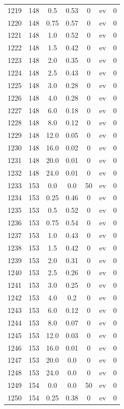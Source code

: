 \documentclass[12pt,a4paper]{article}
\begin{document}
\begin{tabular}{r|cccccc}
	1219 & 148 & 0.5 & 0.53 & 0 & ev & 0 \\
	1220 & 148 & 0.75 & 0.57 & 0 & ev & 0 \\
	1221 & 148 & 1.0 & 0.52 & 0 & ev & 0 \\
	1222 & 148 & 1.5 & 0.42 & 0 & ev & 0 \\
	1223 & 148 & 2.0 & 0.35 & 0 & ev & 0 \\
	1224 & 148 & 2.5 & 0.43 & 0 & ev & 0 \\
	1225 & 148 & 3.0 & 0.28 & 0 & ev & 0 \\
	1226 & 148 & 4.0 & 0.28 & 0 & ev & 0 \\
	1227 & 148 & 6.0 & 0.18 & 0 & ev & 0 \\
	1228 & 148 & 8.0 & 0.12 & 0 & ev & 0 \\
	1229 & 148 & 12.0 & 0.05 & 0 & ev & 0 \\
	1230 & 148 & 16.0 & 0.02 & 0 & ev & 0 \\
	1231 & 148 & 20.0 & 0.01 & 0 & ev & 0 \\
	1232 & 148 & 24.0 & 0.01 & 0 & ev & 0 \\
	1233 & 153 & 0.0 & 0.0 & 50 & ev & 0 \\
	1234 & 153 & 0.25 & 0.46 & 0 & ev & 0 \\
	1235 & 153 & 0.5 & 0.52 & 0 & ev & 0 \\
	1236 & 153 & 0.75 & 0.54 & 0 & ev & 0 \\
	1237 & 153 & 1.0 & 0.43 & 0 & ev & 0 \\
	1238 & 153 & 1.5 & 0.42 & 0 & ev & 0 \\
	1239 & 153 & 2.0 & 0.31 & 0 & ev & 0 \\
	1240 & 153 & 2.5 & 0.26 & 0 & ev & 0 \\
	1241 & 153 & 3.0 & 0.25 & 0 & ev & 0 \\
	1242 & 153 & 4.0 & 0.2 & 0 & ev & 0 \\
	1243 & 153 & 6.0 & 0.12 & 0 & ev & 0 \\
	1244 & 153 & 8.0 & 0.07 & 0 & ev & 0 \\
	1245 & 153 & 12.0 & 0.03 & 0 & ev & 0 \\
	1246 & 153 & 16.0 & 0.01 & 0 & ev & 0 \\
	1247 & 153 & 20.0 & 0.0 & 0 & ev & 0 \\
	1248 & 153 & 24.0 & 0.0 & 0 & ev & 0 \\
	1249 & 154 & 0.0 & 0.0 & 50 & ev & 0 \\
	1250 & 154 & 0.25 & 0.38 & 0 & ev & 0 \\

\end{tabular}
\end{document}
